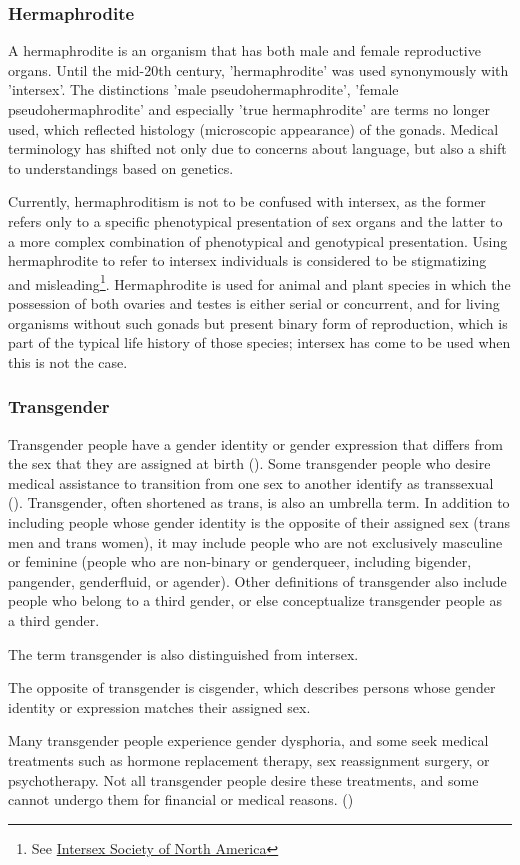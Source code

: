 \subsubsection{Hermaphrodite}
\label{hermaphrodite}
A hermaphrodite is an organism that has both male and female reproductive organs. Until the mid-20th century, 'hermaphrodite' was used synonymously with 'intersex'. The distinctions 'male pseudohermaphrodite', 'female pseudohermaphrodite' and especially 'true hermaphrodite' are terms no longer used, which reflected histology (microscopic appearance) of the gonads. Medical terminology has shifted not only due to concerns about language, but also a shift to understandings based on genetics.

Currently, hermaphroditism is not to be confused with intersex, as the former refers only to a specific phenotypical presentation of sex organs and the latter to a more complex combination of phenotypical and genotypical presentation. Using hermaphrodite to refer to intersex individuals is considered to be stigmatizing and misleading\footnote{See \href{https://web.archive.org/web/20130701061246/http://www.isna.org/faq/hermaphrodite}{Intersex Society of North America}}. Hermaphrodite is used for animal and plant species in which the possession of both ovaries and testes is either serial or concurrent, and for living organisms without such gonads but present binary form of reproduction, which is part of the typical life history of those species; intersex has come to be used when this is not the case.

\subsubsection{Transgender}
Transgender people have a gender identity or gender expression that differs from the sex that they are assigned at birth (\cite{altilio}). Some transgender people who desire medical assistance to transition from one sex to another identify as transsexual (\cite{polly}). Transgender, often shortened as trans, is also an umbrella term. In addition to including people whose gender identity is the opposite of their assigned sex (trans men and trans women), it may include people who are not exclusively masculine or feminine (people who are non-binary or genderqueer, including bigender, pangender, genderfluid, or agender). Other definitions of transgender also include people who belong to a third gender, or else conceptualize transgender people as a third gender.

The term transgender is also distinguished from intersex. 

The opposite of transgender is cisgender, which describes persons whose gender identity or expression matches their assigned sex.

Many transgender people experience gender dysphoria, and some seek medical treatments such as hormone replacement therapy, sex reassignment surgery, or psychotherapy. Not all transgender people desire these treatments, and some cannot undergo them for financial or medical reasons. (\cite{maizes})


